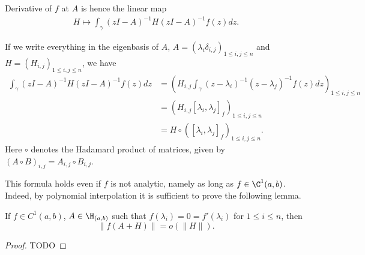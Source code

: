 Derivative of $f$ at $A$ is hence the linear map
\begin{align*}
	H \mapsto \int_{\gamma} (z I - A)^{-1} H (z I - A)^{-1} f(z) dz.
\end{align*}

If we write everything in the eigenbasis of $A$, $A = (\lambda_{i} \delta_{i, j})_{1 \leq i, j \leq n}$ and $H = (H_{i, j})_{1 \leq i,j \leq n}$, we have
\begin{align*}
	\int_{\gamma} (z I - A)^{-1} H (z I - A)^{-1} f(z) dz &= \left(H_{i, j} \int_{\gamma} (z - \lambda_{i})^{-1} (z - \lambda_{j})^{-1} f(z) dz \right)_{1 \leq i, j \leq n} \\
	&= \left(H_{i, j} [\lambda_{i}, \lambda_{j}]_{f} \right)_{1 \leq i, j \leq n} \\
	&= H \circ \left([\lambda_{i}, \lambda_{j}]_{f} \right)_{1 \leq i, j \leq n}.
\end{align*}
Here $\circ$ denotes the Hadamard product of matrices, given by $(A \circ B)_{i, j} = A_{i, j} \circ B_{i, j}$.

This formula holds even if $f$ is not analytic, namely as long as $f \in \C^{1}(a, b)$. Indeed, by polynomial interpolation it is sufficient to prove the following lemma.
\begin{lem}
	If $f \in C^{1}(a, b)$, $A \in \H_{(a, b)}$ such that $f(\lambda_{i}) = 0 = f'(\lambda_{i})$ for $1 \leq i \leq n$, then
	\[
		\|f(A + H)\| = o(\|H\|).
	\]
\end{lem}
\begin{proof}
	TODO
\end{proof}

\begin{comment}

TODO: Start with polynomials.

If $f$ is entire with $f(z) = \sum_{n = 0}^{\infty} a_{n} z^{n}$ we have
\begin{align*}
	f(A + B) &= a_{0} I \\
			&+ a_{1} (A + B) \\
			&+ a_{2} (A^2 + AB + BA + B^2) \\
			&+ a_{3} (A^3 + A^2 B + ABA + AB^2 + BA^2 + BAB + B^2A + B^3) \\
			&+ \ldots
\end{align*}
Hence we have
\begin{align*}
	\lim_{t \to 0} \frac{f(A + tB) - f(A)}{t} &= a_{1} B \\
			&+ a_{2} (AB + BA) \\
			&+ a_{3} (B A^2 + ABA + A^2 B) \\
			&+ a_{4} (B A^{3} + ABA^2 + A^2BA + A^3 B) \\
			&+ \ldots \\
			&= \sum_{n = 1}^{\infty} a_{n} \sum_{0 \leq k \leq n - 1} A^{k} B A^{n - 1 - k}.
\end{align*}

\end{comment}

